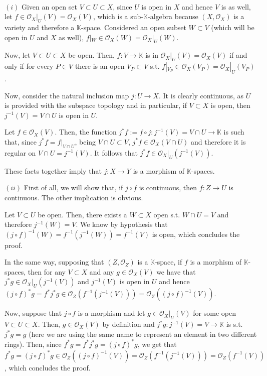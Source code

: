 \documentclass{article}
\newcommand{\numberset}{\mathbb}
\newcommand{\K}{\numberset{K}}
\newcommand{\exercise}[1]{\noindent {\bf Exercise #1}}
\begin{document}
~\\
\exercise{2}

$(i)$ Given an open set $V\subset U\subset X$, since $U$ is open in $X$ and hence $V$ is as well, let $f\in\mathcal{O}_X|_U(V)=\mathcal{O}_X(V)$, which is a sub-$\K$-algebra because $(X,\mathcal{O}_X)$ is a variety and therefore a $\K$-space. Considered an open subset $W\subset V$ (which will be open in $U$ and $X$ as well), $f|_W\in\mathcal{O}_X(W)=\mathcal{O}_X|_U(W)$.

Now, let $V\subset U\subset X$ be open. Then, $f:V\rightarrow\K$ is in $\mathcal{O}_X|_U(V)=\mathcal{O}_X(V)$ if and only if for every $P\in V$ there is an open $V_P\subset V$ s.t. $f|_{V_P}\in\mathcal{O}_X(V_P)=\mathcal{O}_X|_{U}(V_P)$.

Now, consider the natural inclusion map $j:U\rightarrow X$. It is clearly continuous, as $U$ is provided with the subspace topology and in particular, if $V\subset X$ is open, then $j^{-1}(V)=V\cap U$ is open in $U$.

Let $f\in\mathcal{O}_X(V)$. Then, the function $j^*f:=f\circ j:j^{-1}(V)=V\cap U\rightarrow\K$ is such that, since $j^*f=f|_{V\cap U}$, being $V\cap U\subset V$, $j^*f\in\mathcal{O}_X(V\cap U)$ and therefore it is regular on $V\cap U=j^{-1}(V)$. It follows that $j^*f\in\mathcal{O}_X|_U(j^{-1}(V))$.

These facts together imply that $j:X\rightarrow Y$ is a morphism of $\K$-spaces.

$(ii)$ First of all, we will show that, if $j\circ f$ is continuous, then $f:Z\rightarrow U$ is continuous. The other implication is obvious.

Let $V\subset U$ be open. Then, there exists a $W\subset X$ open s.t. $W\cap U=V$ and therefore $j^{-1}(W)=V$. We know by hypothesis that $(j\circ f)^{-1}(W)=f^{-1}(j^{-1}(W))=f^{-1}(V)$ is open, which concludes the proof.

In the same way, supposing that $(Z,\mathcal{O}_Z)$ is a $\K$-space, if $f$ is a morphism of $\K$-spaces, then for any $V\subset X$ and any $g\in\mathcal{O}_X(V)$ we have that $j^*g\in\mathcal{O}_X|_U(j^{-1}(V))$ and $j^{-1}(V)$ is open in $U$ and hence $(j\circ f)^*g=f^*j^*g\in\mathcal{O}_Z(f^{-1}(j^{-1}(V)))=\mathcal{O}_Z((j\circ f)^{-1}(V))$.

Now, suppose that $j\circ f$ is a morphism and let $g\in\mathcal{O}_X|_U(V)$ for some open $V\subset U\subset X$. Then, $g\in\mathcal{O}_X(V)$ by definition and $j^*g:j^{-1}(V)=V\rightarrow\K$ is s.t. $j^*g=g$ (here we are using the same name to represent an element in two different rings). Then, since $f^*g=f^*j^*g=(j\circ f)^*g$, we get that $f^*g=(j\circ f)^*g\in\mathcal{O}_Z((j\circ f)^{-1}(V))=\mathcal{O}_Z(f^{-1}(j^{-1}(V)))=\mathcal{O}_Z(f^{-1}(V))$, which concludes the proof.
\end{document}
